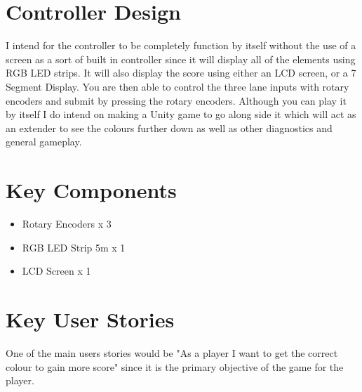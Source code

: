 \documentclass{article}
\begin{document}
\section{Controller Design}

I intend for the controller to be completely function by itself without the use of a screen as a sort of built in controller since it will display all of the elements using RGB LED strips. It will also display the score using either an LCD screen, or a 7 Segment Display. You are then able to control the three lane inputs with rotary encoders and submit by pressing the rotary encoders. Although you can play it by itself I do intend on making a Unity game to go along side it which will act as an extender to see the colours further down as well as other diagnostics and general gameplay.

\section{Key Components}

\begin{itemize}
    \item Rotary Encoders x 3
    \item RGB LED Strip 5m x 1
    \item LCD Screen x 1
\end{itemize}

\section{Key User Stories}

One of the main users stories would be "As a player I want to get the correct colour to gain more score" since it is the primary objective of the game for the player.
\end{document}
